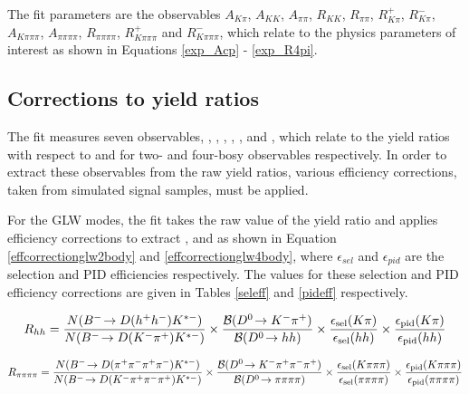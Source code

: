 The \CP fit parameters are the \CP observables $A_{K\pi}$, $A_{KK}$, $A_{\pi\pi}$, $R_{KK}$, $R_{\pi\pi}$, $R^+_{K\pi}$, $R^-_{K\pi}$, $A_{K\pi\pi\pi}$, $A_{\pi\pi\pi\pi}$, $R_{\pi\pi\pi\pi}$, $R^+_{K\pi\pi\pi}$ and $R^-_{K\pi\pi\pi}$, which relate to the physics parameters of interest as shown in Equations \ref{exp_Acp} - \ref{exp_R4pi}.

\subsection{Corrections to yield ratios}
\label{sec:cpfit:efficiencies}

The \CP fit measures seven \CP observables, \Rkk, \Rpipi, \Rptwo, \Rmtwo, \Rpipipipi, \Rpfour and \Rmfour, which relate to the yield ratios with respect to \decay{\Bm}{\D(\Km\pip)\Kstarm} and \decay{\Bm}{\D(\Km\pip\pim\pip)\Kstarm} for two- and four-bosy observables respectively. In order to extract these \CP observables from the raw yield ratios, various efficiency corrections, taken from simulated signal samples, must be applied.

For the GLW modes, the fit takes the raw value of the yield ratio and applies efficiency corrections to extract \Rkk, \Rpipi and \Rpipipipi as shown in Equation \ref{effcorrectionglw2body} and \ref{effcorrectionglw4body}, where $\epsilon_{sel}$ and $\epsilon_{pid}$ are the selection and PID efficiencies respectively. The values for these selection and PID efficiency corrections are given in Tables \ref{seleff} and \ref{pideff} respectively.

{\footnotesize
\begin{equation}
R_{hh} = \frac{N({{{B}^-}}\!\rightarrow {\ensuremath{D}}(h^+h^-){{K}^{*-}})}{N({{{B}^-}}\!\rightarrow {\ensuremath{D}}({{K}^-}{{\pi}^+}){{K}^{*-}})} \times \frac{{\mathcal{B}}({{D}^0}\!\rightarrow {\ensuremath{{K}^-}}{\ensuremath{{\pi}^+}})}{{\mathcal{B}}({{D}^0}\!\rightarrow hh)} \times \frac{\epsilon_{\text{sel}}(K\pi)}{\epsilon_{\text{sel}}(hh)} \times \frac{\epsilon_{\text{pid}}(K\pi)}{\epsilon_{\text{pid}}(hh)}
\label{effcorrectionglw2body}
\end{equation}

\begin{equation}
R_{\pi\pi\pi\pi} = \frac{N({{{B}^-}}\!\rightarrow {\ensuremath{D}}({{\pi}^+}{{\pi}^-}{{\pi}^+}{{\pi}^-}){{K}^{*-}})}{N({{{B}^-}}\!\rightarrow {\ensuremath{D}}({{K}^-}{{\pi}^+}{{\pi}^-}{{\pi}^+}){{K}^{*-}})} \times \frac{{\mathcal{B}}({{D}^0}\!\rightarrow {\ensuremath{{K}^-}}{\ensuremath{{\pi}^+}}{\ensuremath{{\pi}^-}}{\ensuremath{{\pi}^+}})}{{\mathcal{B}}({{D}^0}\!\rightarrow \pi\pi\pi\pi)} \times \frac{\epsilon_{\text{sel}}(K\pi\pi\pi)}{\epsilon_{\text{sel}}(\pi\pi\pi\pi)} \times \frac{\epsilon_{\text{pid}}(K\pi\pi\pi)}{\epsilon_{\text{pid}}(\pi\pi\pi\pi)} 
\label{effcorrectionglw4body}
\end{equation}}


